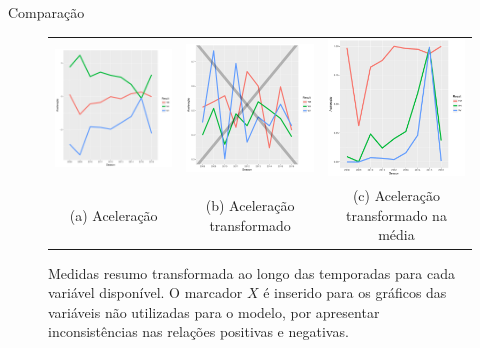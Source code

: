 \documentclass[doc,apacite,oneside,a4paper,12pt]{apa6}
\begin{document}
Comparação


\begin{figure}
\begin{tabular}{ccc}
  \includegraphics[width=55mm]{aceleracao_result} & \includegraphics[width=55mm]{aceleracao_result_trans} & \includegraphics[width=55mm]{aceleracao_result_trans_media}\\
\scriptsize{(a) Aceleração } & \scriptsize{(b) Aceleração transformado  } & \scriptsize{(c) Aceleração transformado na média} \\[3pt]

\end{tabular}
    \caption[\scriptsize{Medidas resumo transformado.}]{\scriptsize{Medidas resumo transformada ao longo das temporadas para cada variável disponível. O marcador $X$ é inserido para os gráficos das variáveis não utilizadas para o modelo, por apresentar inconsistências nas relações positivas e negativas.}}
    \label{fig:medresumcomparacao}
\end{figure}
\end{document}
